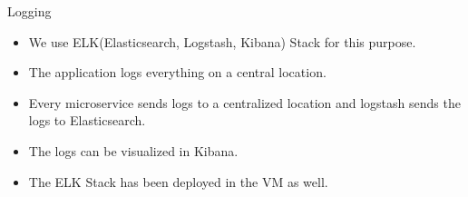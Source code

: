 \begin{frame}{Logging}
	\begin{itemize}
	\item We use ELK(Elasticsearch, Logstash, Kibana) Stack for this purpose.
	\item The application logs everything on a central location.
    \item Every microservice sends logs to a centralized location and logstash sends the logs to Elasticsearch.
    \item The logs can be visualized in Kibana.
    \item The ELK Stack has been deployed in the VM as well.
	\end{itemize}
\end{frame}